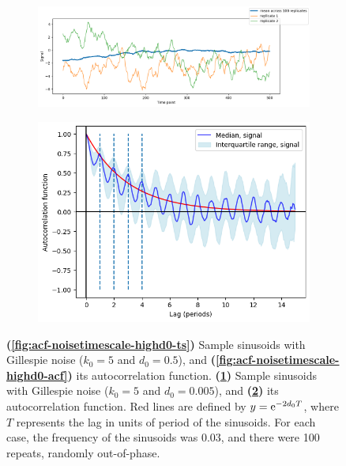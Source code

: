\begin{figure}
  \begin{subfigure}[t]{0.6\textwidth}
  \centering
    \includegraphics[width=\linewidth]{gillespie_k5_d0p005_mean.png}
    \caption{
    }
    \label{fig:acf-noisetimescale-lowd0-ts}
  \end{subfigure}%
  \begin{subfigure}[t]{0.4\textwidth}
  \centering
    \includegraphics[width=\linewidth]{gillespie_k5_d0p005_acf.png}
    \caption{
    }
    \label{fig:acf-noisetimescale-lowd0-acf}
  \end{subfigure}

  \caption[
    Effect of death rate of Gillespie noise on the autocorrelation function.
  ]{
    \textbf{(\ref{fig:acf-noisetimescale-highd0-ts})} Sample sinusoids with Gillespie noise ($k_{0} = 5$ and $d_{0} = 0.5$), and
    \textbf{(\ref{fig:acf-noisetimescale-highd0-acf})} its autocorrelation function.
    \textbf{(\ref{fig:acf-noisetimescale-lowd0-ts})} Sample sinusoids with Gillespie noise ($k_{0} = 5$ and $d_{0} = 0.005$), and
    \textbf{(\ref{fig:acf-noisetimescale-lowd0-acf})} its autocorrelation function.
    Red lines are defined by $y = \mathrm{e}^{-2d_{0}T}$, where $T$ represents the lag in units of period of the sinusoids.
    For each case, the frequency of the sinusoids was 0.03, and there were 100 repeats, randomly out-of-phase.
  }
  \label{fig:acf-noisetimescale}
\end{figure}

